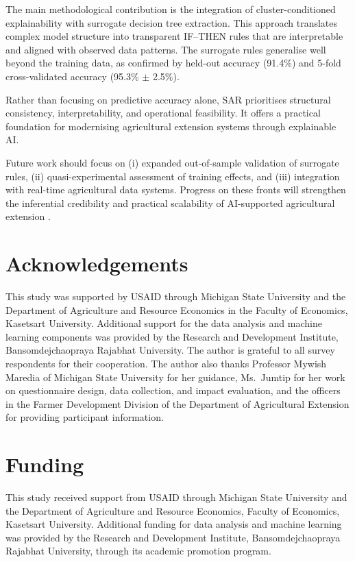 \documentclass[3p,twocolumn,authoryear]{elsarticle}
\begin{document}
The main methodological contribution is the integration of cluster-conditioned
explainability with surrogate decision tree extraction. This approach translates
complex model structure into transparent IF--THEN rules that are interpretable
and aligned with observed data patterns. The surrogate rules generalise well
beyond the training data, as confirmed by held-out accuracy (91.4\%) and 5-fold
cross-validated accuracy (95.3\% $\pm$ 2.5\%).

Rather than focusing on predictive accuracy alone, SAR prioritises structural
consistency, interpretability, and operational feasibility. It offers a
practical foundation for modernising agricultural extension systems through
explainable AI.

Future work should focus on (i) expanded out-of-sample validation of surrogate
rules, (ii) quasi-experimental assessment of training effects, and (iii)
integration with real-time agricultural data systems. Progress on these fronts
will strengthen the inferential credibility and practical scalability of
AI-supported agricultural extension \citep{yang2025,zhang2026}.


\section*{Acknowledgements}
This study was supported by USAID through Michigan State University and the
Department of Agriculture and Resource Economics in the Faculty of Economics,
Kasetsart University. Additional support for the data analysis and machine
learning components was provided by the Research and Development Institute,
Bansomdejchaopraya Rajabhat University. The author is grateful to all survey
respondents for their cooperation. The author also thanks Professor Mywish
Maredia of Michigan State University for her guidance, Ms.\ Jumtip for her work
on questionnaire design, data collection, and impact evaluation, and the
officers in the Farmer Development Division of the Department of Agricultural
Extension for providing participant information.

\section*{Funding}
This study received support from USAID through Michigan State University and the
Department of Agriculture and Resource Economics, Faculty of Economics,
Kasetsart University. Additional funding for data analysis and machine learning
was provided by the Research and Development Institute, Bansomdejchaopraya
Rajabhat University, through its academic promotion program.
\end{document}
